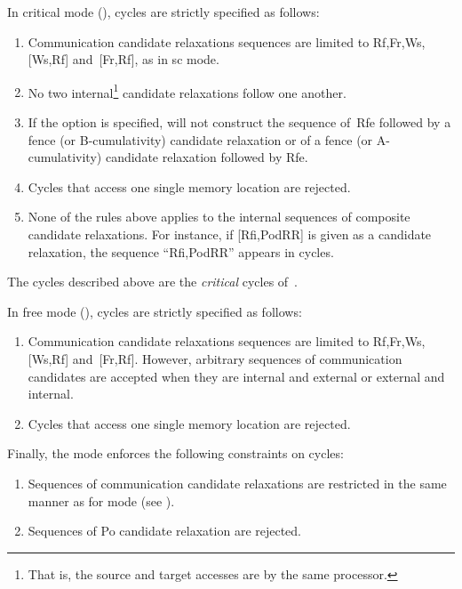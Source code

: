 \label{critical:def}%
In critical mode (),  cycles are strictly specified as
follows:
\begin{enumerate}
\item Communication candidate relaxations sequences are
limited to Rf,Fr,Ws,[Ws,Rf] and~[Fr,Rf], as in sc mode.
\item No two internal\footnote{That is, the source and target
accesses are by the same processor.} candidate relaxations follow one another.
\item If the option  is specified,
\diy{} will not construct
the sequence of~Rfe followed by a fence (or B-cumulativity) candidate
relaxation or
of a fence (or A-cumulativity) candidate relaxation followed by Rfe.
\item Cycles that access one single memory location are rejected.
\item None of the rules above applies to the internal sequences of
composite candidate relaxations. For instance, if [Rfi,PodRR]
is given as a candidate relaxation, the sequence ``Rfi,PodRR'' appears
in cycles.
\end{enumerate}
The cycles described above are the \emph{critical} cycles of~\cite{ss88}.

\label{free:def}%
In free mode (), cycles are strictly specified as
follows:
\begin{enumerate}
\item Communication candidate relaxations sequences are
limited to Rf,Fr,Ws,[Ws,Rf] and~[Fr,Rf]. However, arbitrary sequences
of communication candidates are accepted when they are internal and external
or external and internal.
\item Cycles that access one single memory location are rejected.
\end{enumerate}

\label{uni:def}Finally, the  mode enforces the following constraints
on cycles:
\begin{enumerate}
\item Sequences of communication  candidate relaxations
are restricted in the same manner as for
 mode (see ).
\item Sequences of Po candidate relaxation are rejected.
\end{enumerate}

